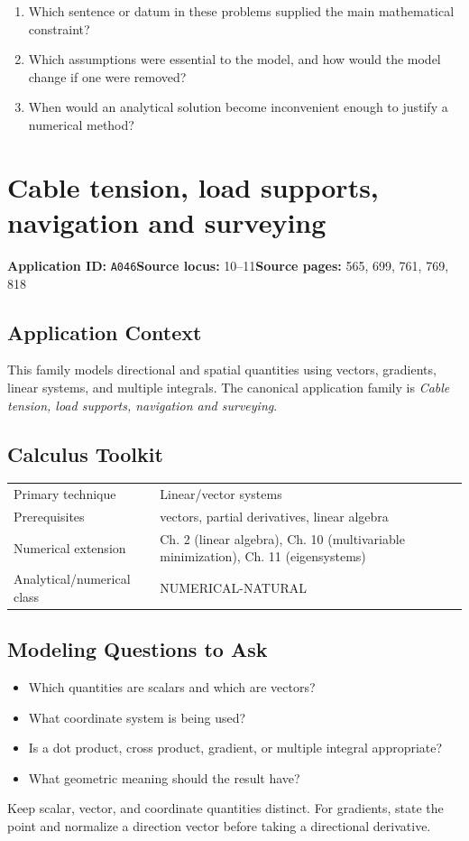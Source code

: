 \documentclass[11pt]{book}
\newcommand{\pid}[1]{\texttt{#1}}
\begin{document}
\begin{reflectionbox}\begin{enumerate}
\item Which sentence or datum in these problems supplied the main mathematical constraint?
\item Which assumptions were essential to the model, and how would the model change if one were removed?
\item When would an analytical solution become inconvenient enough to justify a numerical method?
\end{enumerate}\end{reflectionbox}
\chapter{Cable tension, load supports, navigation and surveying}\label{app:A046}
\textbf{Application ID:} \pid{A046}\quad \textbf{Source locus:} 10–11\quad \textbf{Source pages:} 565, 699, 761, 769, 818
\section*{Application Context}
This family models directional and spatial quantities using vectors, gradients, linear systems, and multiple integrals. The canonical application family is \emph{Cable tension, load supports, navigation and surveying}.
\section*{Calculus Toolkit}
\begin{tabularx}{\textwidth}{@{}lX@{}}\toprule
Primary technique & Linear/vector systems \\
Prerequisites & vectors, partial derivatives, linear algebra \\
Numerical extension & Ch. 2 (linear algebra), Ch. 10 (multivariable minimization), Ch. 11 (eigensystems) \\
Analytical/numerical class & NUMERICAL-NATURAL \\
\bottomrule\end{tabularx}
\section*{Modeling Questions to Ask}\begin{itemize}
\item Which quantities are scalars and which are vectors?
\item What coordinate system is being used?
\item Is a dot product, cross product, gradient, or multiple integral appropriate?
\item What geometric meaning should the result have?
\end{itemize}
\begin{errorbox}Keep scalar, vector, and coordinate quantities distinct. For gradients, state the point and normalize a direction vector before taking a directional derivative.\end{errorbox}
\end{document}
